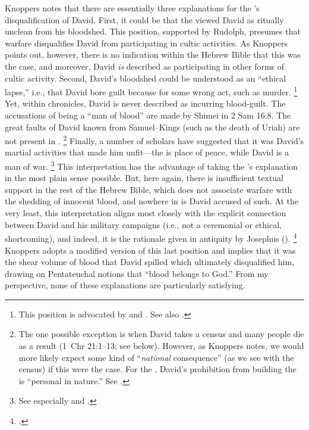 Knoppers notes that there are essentially three explanations for the \chronicler's disqualification of David. First, it could be that the \chronicler viewed David as ritually unclean from his bloodshed. This position, supported by Rudolph,\autocite[151]{rudolph1955} presumes that warfare disqualifies David from participating in cultic activities. As Knoppers points out, however, there is no indication within the Hebrew Bible that this was the case, and moreover, David \emph{is} described as participating in other forms of cultic activity.\autocite[772]{knoppers2007} Second, David's bloodshed could be understood as an ``ethical lapse,'' i.e., that David bore guilt because for some wrong act, such as murder.%
    \footnote{This position is advocated by \cite[53]{dirksen_jsot1996} and \cite{kelly_jsot1998}. See also \cite{braun_jbl1976}.}
Yet, within chronicles, David is never described as incurring blood-guilt. The accusations of being a ``man of blood'' are made by Shimei in 2 Sam 16:8. The great faults of David known from Samuel--Kings (such as the death of Uriah) are not present in \chronicles.%
    \footnote{The one possible exception is when David takes a census and many people die as a result (1~Chr 21:1--13; see below). However, as Knoppers notes, we would more likely expect some kind of ``\emph{national} consequence'' (as we see with the census) if this were the case. For the \chronicler, David's prohibition from building the \temple is ``personal in nature.'' See \cite[772--773]{knoppers2007}.}
Finally, a number of scholars have suggested that it was David's martial activities that made him unfit---the \temple is place of peace, while David is a man of war.%
    \footnote{See especially \cite[396--397]{japhet1993} and \cite{mckenzie_graham-etal1999}.}
This interpretation has the advantage of taking the \chronicler's explanation in the most plain sense possible. But, here again, there is insufficient textual support in the rest of the Hebrew Bible, which does not associate warfare with the shedding of innocent blood, and nowhere in \chronicles is David accused of such. At the very least, this interpretation aligns most closely with the explicit connection between David and his military campaigns (i.e., not a ceremonial or ethical, shortcoming), and indeed, it is the rationale given in antiquity by Josephus ().%
    \footnote{\cite[773]{knoppers2007}.}
Knoppers adopts a modified version of this last position and implies that it was the shear volume of blood that David spilled which ultimately disqualified him, drawing on Pentateuchal notions that ``blood belongs to God.''\autocite[774]{knoppers2007} From my perspective, none of these explanations are particularly satisfying. 

